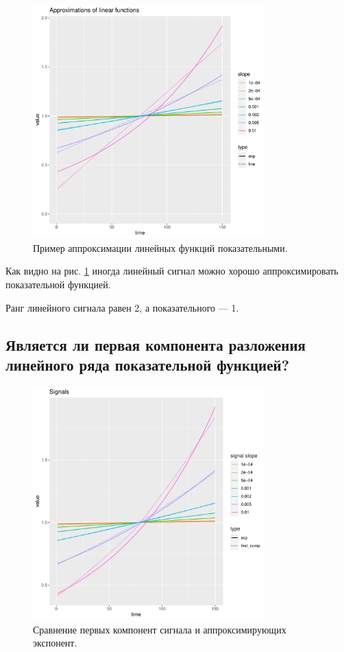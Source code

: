 \documentclass[specialist, substylefile = spbureport.rtx,
    subf,href,colorlinks=true, 12pt]{disser}
\begin{document}
        \begin{figure}[h]
            \centering
            \includegraphics[width=0.8\textwidth]{experiment_3_expline.pdf}
            \caption{Пример аппроксимации линейных функций показательными.}
            \label{fig:exp3_expline}
        \end{figure}

        Как видно на рис. \ref{fig:exp3_expline} иногда линейный сигнал можно хорошо аппроксимировать показательной функцией.

        Ранг линейного сигнала равен 2, а показательного --- 1.

    \subsection{Является ли первая компонента разложения линейного ряда показательной функцией?}

        \begin{figure}[h]
            \centering
            \includegraphics[width=0.8\textwidth]{experiment_3_linefirstcomp.pdf}
            \caption{Сравнение первых компонент сигнала и аппроксимирующих экспонент.}
            \label{fig:exp3_linefirstcomp}
        \end{figure}
\end{document}
